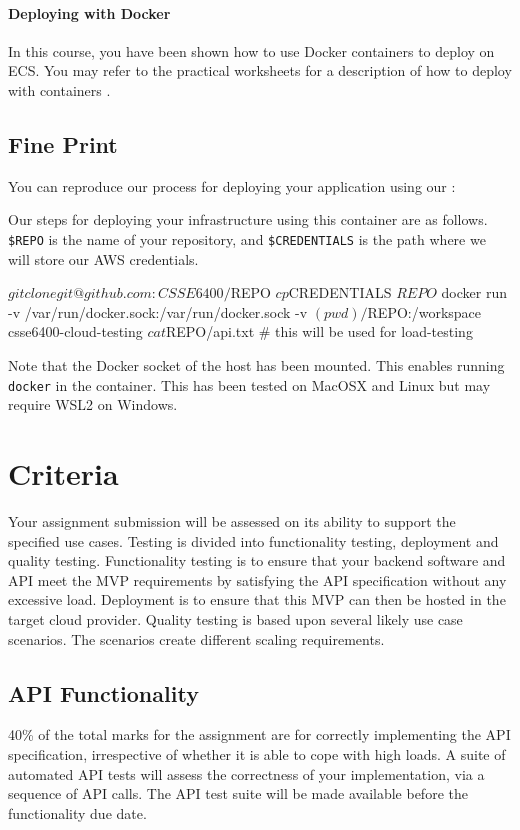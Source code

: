 \documentclass{csse4400}
\begin{document}
\paragraph{Deploying with Docker}
In this course, you have been shown how to use Docker containers to deploy on ECS. You may refer to the practical worksheets for a description of how to deploy with containers \cite{prac-week5}.

\subsection{Fine Print}
You can reproduce our process for deploying your application using our :

Our steps for deploying your infrastructure using this container are as follows.
\texttt{\$REPO} is the name of your repository, and
\texttt{\$CREDENTIALS} is the path where we will store our AWS credentials.
\begin{code}[language=shell]{}
$ git clone git@github.com:CSSE6400/$REPO
$ cp $CREDENTIALS $REPO
$ docker run -v /var/run/docker.sock:/var/run/docker.sock -v $(pwd)/$REPO:/workspace csse6400-cloud-testing
$ cat $REPO/api.txt # this will be used for load-testing
\end{code}

\noindent
Note that the Docker socket of the host has been mounted. This enables running \texttt{docker} in the container. This has been tested on MacOSX and Linux but may require WSL2 on Windows.


\section{Criteria}
Your assignment submission will be assessed on its ability to support the specified use cases. Testing is divided into functionality testing, deployment and quality testing. Functionality testing is to ensure that your backend software and API meet the MVP requirements by satisfying the API specification without any excessive load. Deployment is to ensure that this MVP can then be hosted in the target cloud provider. Quality testing is based upon several likely use case scenarios. The scenarios create different scaling requirements.

\subsection{API Functionality} %
40\% of the total marks for the assignment are for correctly implementing the API specification, irrespective of whether it is able to cope with high loads. A suite of automated API tests will assess the correctness of your implementation, via a sequence of API calls. The API test suite will be made available before the functionality due date.
\end{document}
